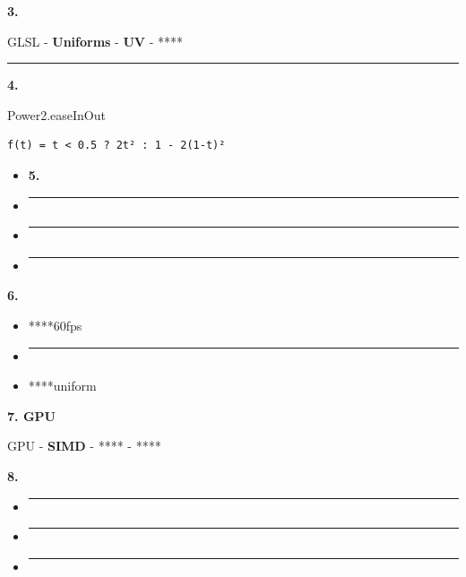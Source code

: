 \textbf{3. }

GLSL - \textbf{Uniforms} - \textbf{UV} - ****

\begin{center}\rule{0.5\linewidth}{0.5pt}\end{center}

\textbf{4. }

Power2.easeInOut

\begin{verbatim}
f(t) = t < 0.5 ? 2t² : 1 - 2(1-t)²
\end{verbatim}

\begin{itemize}
\item
  \textbf{5. }
\item
  \begin{center}\rule{0.5\linewidth}{0.5pt}\end{center}
\item
  \begin{center}\rule{0.5\linewidth}{0.5pt}\end{center}
\item
  \begin{center}\rule{0.5\linewidth}{0.5pt}\end{center}
\end{itemize}

\textbf{6. }

\begin{itemize}
\item
  ****60fps
\item
  \begin{center}\rule{0.5\linewidth}{0.5pt}\end{center}
\item
  ****uniform
\end{itemize}

\textbf{7. GPU}

GPU - \textbf{SIMD} - **** - ****

\textbf{8. }

\begin{itemize}
\item
  \begin{center}\rule{0.5\linewidth}{0.5pt}\end{center}
\item
  \begin{center}\rule{0.5\linewidth}{0.5pt}\end{center}
\item
  \begin{center}\rule{0.5\linewidth}{0.5pt}\end{center}
\end{itemize}

